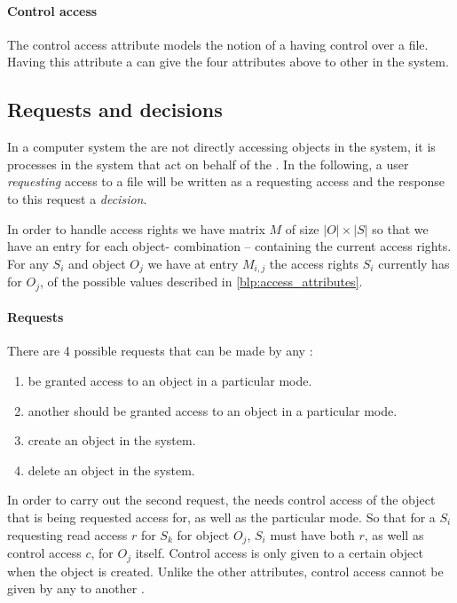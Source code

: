 \paragraph{Control access}
The control access attribute models the notion of a \ssubject{} having control over a file.
Having this attribute a \ssubject{} can give the four attributes above to other \subjects{} in the system.

\subsection{Requests and decisions}
In a computer system the \subjects{} are not directly accessing objects in the system, it is processes in the system that act on behalf of the \ssubject{}.
In the following, a user \emph{requesting} access to a file will be written as a \ssubject{} requesting access and the response to this request a \emph{decision}.

In order to handle access rights we have matrix $M$ of size $|O| \times |S|$ so that we have an entry for each object-\ssubject{} combination -- containing the current access rights.
For any \ssubject{} $S_i$ and object $O_j$ we have at entry $M_{i,j}$ the access rights $S_i$ currently has for $O_j$, of the possible values described in \cref{blp:access_attributes}.

\paragraph{Requests}
There are 4 possible requests that can be made by any \ssubject{}:
\begin{enumerate}
  \item be granted access to an object in a particular mode.
  \item another \ssubject{} should be granted access to an object in a particular mode.
  \item create an object in the system.
  \item delete an object in the system.
\end{enumerate}

In order to carry out the second request, the \ssubject{} needs control access of the object that is being requested access for, as well as the particular mode.
So that for a \ssubject{} $S_i$ requesting read access $r$ for \ssubject{} $S_k$ for object $O_j$, $S_i$ must have both $r$, as well as control access $c$, for $O_j$ itself.
Control access is only given to a certain object when the object is created.
Unlike the other attributes, control access cannot be given by any \ssubject{} to another \ssubject{}.

